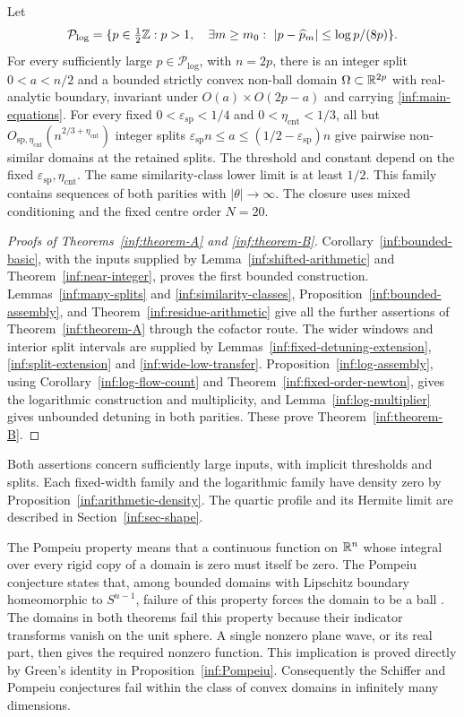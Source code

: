 \begin{maintheorem}\label{inf:theorem-B}
Let
\[
 \mathcal P_{\log}=\{p\in\tfrac12\mathbb{Z}:p>1,\quad
 \exists m\ge m_0:\ |p-\widehat p_m|\le\log p/(8p)\}.
\]
For every sufficiently large $p\in\mathcal P_{\log}$, with $n=2p$, there is an
integer split $0<a<n/2$ and a bounded strictly convex non-ball domain
$\Omega\subset\mathbb{R}^{2p}$ with real-analytic boundary, invariant under
$O(a)\times O(2p-a)$ and carrying \eqref{inf:main-equations}.
For every fixed $0<\varepsilon_{\mathrm{sp}}<1/4$ and
$0<\eta_{\mathrm{cnt}}<1/3$, all but
$O_{\mathrm{sp},\eta_{\mathrm{cnt}}}(n^{2/3+\eta_{\mathrm{cnt}}})$
integer splits $\varepsilon_{\mathrm{sp}}n\le a\le
(1/2-\varepsilon_{\mathrm{sp}})n$ give pairwise non-similar domains
at the retained splits. The threshold and constant depend on the
fixed $\varepsilon_{\mathrm{sp}},\eta_{\mathrm{cnt}}$.
The same similarity-class lower
limit is at least $1/2$. This family contains sequences of both
parities with $|\theta|\to\infty$. The closure uses mixed
conditioning and the fixed centre order $N=20$.
\end{maintheorem}

\begin{proof}[Proofs of Theorems~\ref{inf:theorem-A} and \ref{inf:theorem-B}]
Corollary~\ref{inf:bounded-basic}, with the inputs supplied by
Lemma~\ref{inf:shifted-arithmetic} and Theorem~\ref{inf:near-integer},
proves the first bounded construction.
Lemmas~\ref{inf:many-splits} and \ref{inf:similarity-classes},
Proposition~\ref{inf:bounded-assembly}, and
Theorem~\ref{inf:residue-arithmetic} give all the further assertions
of Theorem~\ref{inf:theorem-A} through the cofactor route.
The wider windows and interior split intervals are supplied by
Lemmas~\ref{inf:fixed-detuning-extension}, \ref{inf:split-extension}
and \ref{inf:wide-low-transfer}.
Proposition~\ref{inf:log-assembly}, using
Corollary~\ref{inf:log-flow-count} and
Theorem~\ref{inf:fixed-order-newton}, gives the logarithmic construction
and multiplicity, and Lemma~\ref{inf:log-multiplier} gives unbounded
detuning in both parities. These prove Theorem~\ref{inf:theorem-B}.
\end{proof}

Both assertions concern sufficiently large inputs, with implicit
thresholds and splits. Each fixed-width family and the logarithmic
family have density zero
by Proposition~\ref{inf:arithmetic-density}. The quartic profile and
its Hermite limit are described in Section~\ref{inf:sec-shape}.

The Pompeiu property means that a continuous function on $\mathbb{R}^n$
whose integral over every rigid copy of a domain is zero must
itself be zero. The Pompeiu conjecture states that, among bounded
domains with Lipschitz boundary homeomorphic to $S^{n-1}$,
failure of this property forces the domain to be a ball
\cite{inf:Wil76,inf:Zal92}. The domains in both theorems fail this property
because their indicator transforms vanish on the unit sphere.
A single nonzero plane wave, or its real part, then gives the
required nonzero function. This implication is proved directly
by Green's identity in Proposition~\ref{inf:Pompeiu}.
Consequently the Schiffer and Pompeiu conjectures fail within
the class of convex domains in infinitely many dimensions.

